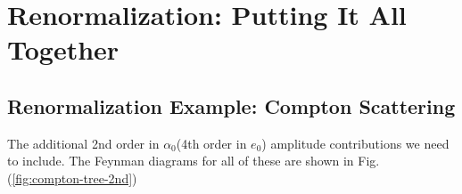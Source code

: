 \chapter{Renormalization: Putting It All Together}
\section{Renormalization Example: Compton Scattering}
The additional 2nd order in $\alpha_0$(4th order in $e_0$) amplitude contributions we need to include. The Feynman diagrams for all of these are shown in Fig. (\ref{fig:compton-tree-2nd})
\begin{figure}[H]
    \centering
{} %
\begin{tikzpicture}[x=0.75pt,y=0.75pt,yscale=-0.8,xscale=0.8]


\end{tikzpicture}
\end{figure}
